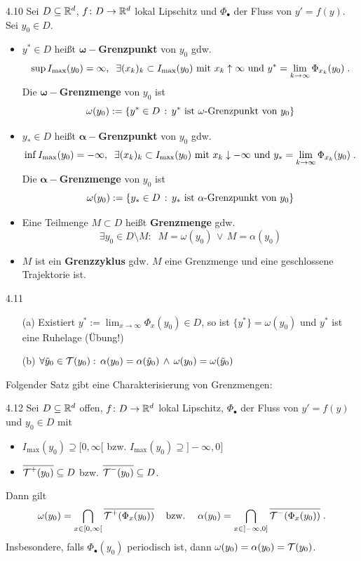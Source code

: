 \documentclass[a4paper]{article}
\begin{document}
\begin{Def}{}{4.10}
Sei $D\subseteq \mathbb R^d$, $f\colon D\to\mathbb R^d$ lokal Lipschitz und $\Phi_{\bullet}$ der Fluss von $y'=f(y)$. Sei $y_0\in D$.
\begin{itemize}
\item $y^*\in D$ heißt $\bm{\omega-}$\textbf{Grenzpunkt} von $y_0$ gdw.
\[\sup I_{\max}(y_0)=\infty,\;\;\exists (x_k)_k\subset I_{\max}(y_0)\text{ mit }x_k\uparrow\infty\text{ und }y^*=\lim_{k\to\infty}\Phi_{x_k}(y_0)\;.\]
Die $\bm{\omega-}$\textbf{Grenzmenge} von $y_0$ ist 
\[\omega(y_0):=\{y^*\in D\,:\,y^*\text{ ist $\omega$-Grenzpunkt von $y_0$}\}\]
\item $y_*\in D$ heißt $\bm{\alpha-}$\textbf{Grenzpunkt} von $y_0$ gdw.
\[\inf I_{\max}(y_0)=-\infty,\;\;\exists (x_k)_k\subset I_{\max}(y_0)\text{ mit }x_k\downarrow-\infty\text{ und }y_*=\lim_{k\to\infty}\Phi_{x_k}(y_0)\;.\]
Die $\bm{\alpha-}$\textbf{Grenzmenge} von $y_0$ ist 
\[\omega(y_0):=\{y_*\in D\,:\,y_*\text{ ist $\alpha$-Grenzpunkt von $y_0$}\}\]
\item Eine Teilmenge $M\subset D$ heißt \textbf{Grenzmenge} gdw.
\[\exists y_0\in D\setminus M:\;\;M=\omega(y_0)\,\vee\, M=\alpha(y_0)\]
\item $M$ ist ein \textbf{Grenzzyklus} gdw. $M$ eine Grenzmenge und eine geschlossene Trajektorie ist.
\end{itemize}
\end{Def}

\begin{Bemerkung}{}{4.11}
\begin{itemize}
\item[(a)] Existiert $y^*:=\lim_{x\to\infty}\Phi_x(y_0)\in D$, so ist $\{y^*\}=\omega(y_0)$ und $y^*$ ist eine Ruhelage (Übung!)
\item[(b)] $\forall \tilde{y}_0\in\operatorname{\mathcal{T}}(y_0):\,\alpha(y_0) = \alpha(\tilde{y}_0)\,\wedge\,\omega(y_0)=\omega(\tilde{y}_0)$
\end{itemize}
\end{Bemerkung}

Folgender Satz gibt eine Charakterisierung von Grenzmengen:

\begin{Satz}{}{4.12}
Sei $D\subseteq \mathbb R^d$ offen, $f\colon D\to\mathbb R^d$ lokal Lipschitz, $\Phi_{\bullet}$ der Fluss von $y'=f(y)$ und $y_0\in D$ mit
\begin{itemize}
\item $I_{\max}(y_0)\supseteq [0,\infty[$ bzw. $I_{\max}(y_0)\supseteq ]-\infty,0]$
\item $\overline{\operatorname{\mathcal{T}}^+(y_0)}\subseteq D$ bzw. $\overline{\operatorname{\mathcal{T}}^-(y_0)}\subseteq D$.
\end{itemize}
Dann gilt
\[\omega(y_0)=\bigcap_{x\in[0,\infty[}\overline{\operatorname{\mathcal{T}}^+(\Phi_x(y_0))}\;\;\;\text{ bzw. }\;\;\;\alpha(y_0)=\bigcap_{x\in]-\infty,0]}\overline{\operatorname{\mathcal{T}}^-(\Phi_x(y_0))}\;.\]
Insbesondere, falls $\Phi_{\bullet}(y_0)$ periodisch ist, dann $\omega(y_0)=\alpha(y_0)=\operatorname{\mathcal{T}}(y_0)$.
\end{Satz}
\end{document}
